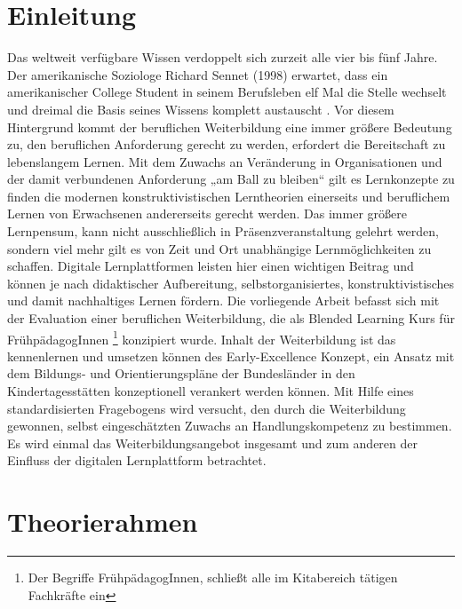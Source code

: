 \documentclass[12pt, bibliography=totoc]{scrartcl}
\begin{document}
%
\tableofcontents
\setcounter{page}{1}
\pagebreak

\section{Einleitung}\label{einleitung}

\glqq Das weltweit verfügbare Wissen verdoppelt sich zurzeit alle vier
bis fünf Jahre. Der amerikanische Soziologe Richard Sennet (1998)
erwartet, dass ein amerikanischer College Student in seinem Berufsleben
elf Mal die Stelle wechselt und dreimal die Basis seines Wissens
komplett austauscht \parencite[138]{Ehlers2002}.\grqq{} Vor diesem
Hintergrund kommt der beruflichen Weiterbildung eine immer größere
Bedeutung zu, den beruflichen Anforderung gerecht zu werden, erfordert
die Bereitschaft zu lebenslangem Lernen. Mit dem Zuwachs an Veränderung
in Organisationen und der damit verbundenen Anforderung „am Ball zu
bleiben`` gilt es Lernkonzepte zu finden die modernen
konstruktivistischen Lerntheorien einerseits und beruflichem Lernen von
Erwachsenen andererseits gerecht werden. Das immer größere Lernpensum,
kann nicht ausschließlich in Präsenzveranstaltung gelehrt werden,
sondern viel mehr gilt es von Zeit und Ort unabhängige Lernmöglichkeiten
zu schaffen. Digitale Lernplattformen leisten hier einen wichtigen
Beitrag und können je nach didaktischer Aufbereitung,
selbstorganisiertes, konstruktivistisches und damit nachhaltiges Lernen
fördern. Die vorliegende Arbeit befasst sich mit der Evaluation einer
beruflichen Weiterbildung, die als Blended Learning Kurs für
FrühpädagogInnen
\footnote{Der Begriffe FrühpädagogInnen, schließt alle im Kitabereich tätigen Fachkräfte ein}
konzipiert wurde. Inhalt der Weiterbildung ist das kennenlernen und
umsetzen können des Early-Excellence Konzept, ein Ansatz mit dem
Bildungs- und Orientierungspläne der Bundesländer in den
Kindertagesstätten konzeptionell verankert werden können. Mit Hilfe
eines standardisierten Fragebogens wird versucht, den durch die
Weiterbildung gewonnen, selbst eingeschätzten Zuwachs an
Handlungskompetenz zu bestimmen. Es wird einmal das
Weiterbildungsangebot insgesamt und zum anderen der Einfluss der
digitalen Lernplattform betrachtet.

\section{Theorierahmen}\label{theorierahmen}
\end{document}
